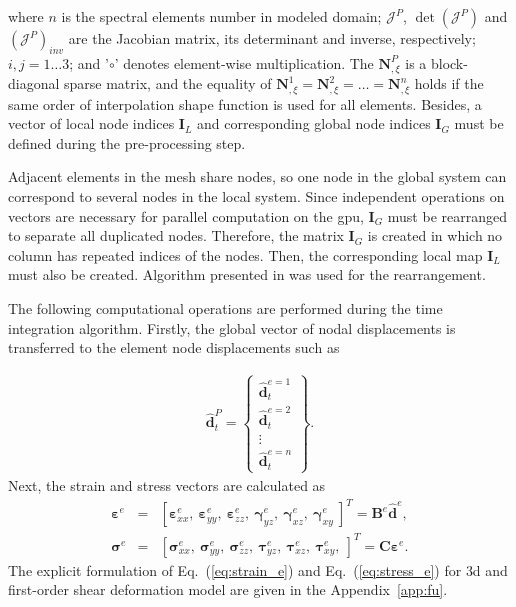 \documentclass[11pt,a4paper,final]{report}
\theoremstyle{plain}
\begin{document}
where $n$ is the spectral elements number in modeled domain; \(\mathcal{J}^P\), \(\det\left(\mathcal{J}^P\right)\) and \(\left(\mathcal{J}^P\right)_{inv}\) are the Jacobian matrix, its determinant and inverse, respectively; $i,j=1\ldots3$; and '$\circ$' denotes element-wise multiplication.
The $\textbf{N}^P_{,\xi}$ is a block-diagonal sparse matrix, and the equality of $\textbf{N}^1_{,\xi}=\textbf{N}^2_{,\xi}=\ldots=\textbf{N}^n_{,\xi}$ holds if the same order of interpolation shape function is used for all elements.
Besides, a vector of local node indices \(\textbf{I}_L\) and corresponding global node indices \(\textbf{I}_G\) must be defined during the pre-processing step.

Adjacent elements in the mesh share nodes, so one node in the global system can correspond to several nodes in the local system.
Since independent operations on vectors are necessary for parallel computation on the \ac{gpu}, $\textbf{I}_G$ must be rearranged to separate all duplicated nodes.
Therefore, the matrix $\textbf{I}_G$ is created in which no column has repeated indices of the nodes.
Then, the corresponding local map $\textbf{I}_L$ must also be created.
Algorithm presented in \cite{kudela2016parallel} was used for the rearrangement.

The following computational operations are performed during the time integration algorithm. Firstly, the global vector of nodal displacements is transferred to the element node displacements such as

\begin{eqnarray}
	\widehat{\textbf{d}}_t^P = \left\{ \begin{array}{c}
		\widehat{\textbf{d}}_t^{e=1}\\
		\widehat{\textbf{d}}_t^{e=2}\\
		\vdots\\
		\widehat{\textbf{d}}_t^{e=n} \end{array}\right\}.
\end{eqnarray}
Next, the strain and stress vectors are calculated as
\begin{eqnarray}
	\label{eq:strain_e}
	\boldsymbol{\varepsilon}^e & = & \left[\boldsymbol{\varepsilon}^e_{xx},\ \boldsymbol{\varepsilon}^e_{yy},\ \boldsymbol{\varepsilon}^e_{zz},\ \boldsymbol{\gamma}^e_{yz},\ \boldsymbol{\gamma}^e_{xz},\ \boldsymbol{\gamma}^e_{xy}\ \right]^T=\textbf{B}^e\widehat{\textbf{d}}^e,\\
	\label{eq:stress_e}
	\boldsymbol{\sigma}^e & = & \left[\boldsymbol{\sigma}^e_{xx},\ \boldsymbol{\sigma}^e_{yy},\ \boldsymbol{\sigma}^e_{zz},\ \boldsymbol{\tau}^e_{yz},\ \boldsymbol{\tau}^e_{xz},\ \boldsymbol{\tau}^e_{xy},\ \right]^T=\textbf{C}\boldsymbol{\varepsilon}^e.
\end{eqnarray}
The explicit formulation of Eq.~(\ref{eq:strain_e}) and Eq.~(\ref{eq:stress_e}) for \ac{3d} and first-order shear deformation model are given in the Appendix~\ref{app:fu}.
\end{document}
